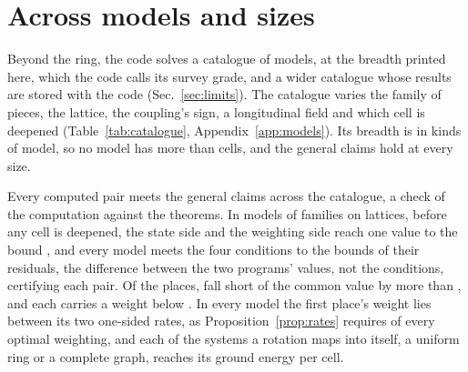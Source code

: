 \documentclass[aps,prd,reprint,superscriptaddress]{revtex4-2}
\begin{document}
\section{Across models and sizes}
\label{sec:breadth}

Beyond the ring, the code solves a catalogue of models, at the breadth printed here, which the code calls its survey grade, and a wider catalogue whose results are stored with the code (Sec.~\ref{sec:limits}). The catalogue varies the family of pieces, the lattice, the coupling's sign, a longitudinal field and which cell is deepened (Table~\ref{tab:catalogue}, Appendix~\ref{app:models}). Its breadth is in kinds of model, so no model has more than  cells, and the general claims hold at every size.

\begin{table}[tp]
  \caption{In the catalogue, by kind of model, Places below counts the places below the common value by more than  before any cell is deepened, with models that differ only in which cell would be deepened counted once. Every such place carries no weight. The last two columns concern the cell deepened to depth , among the models where the solver's weighting gave it weight before: those it drops out of, and the largest weight it keeps where it does not.}
  \label{tab:catalogue}
  \small
  
\end{table}

Every computed pair meets the general claims across the catalogue, a check of the computation against the theorems. In  models of  families on  lattices, before any cell is deepened, the state side and the weighting side reach one value to the bound , and every model meets the four conditions to the bounds of their residuals, the difference between the two programs' values, not the conditions, certifying each pair. Of the places,  fall short of the common value by more than , and each carries a weight below . In every model the first place's weight lies between its two one-sided rates, as Proposition~\ref{prop:rates} requires of every optimal weighting, and each of the  systems a rotation maps into itself, a uniform ring or a complete graph, reaches its ground energy per cell.
\end{document}
